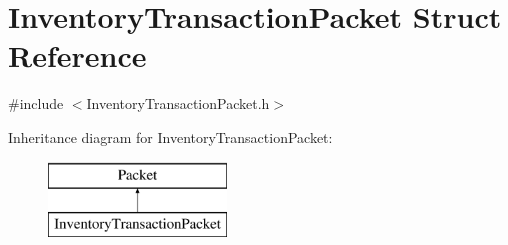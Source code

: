 \hypertarget{struct_inventory_transaction_packet}{}\section{Inventory\+Transaction\+Packet Struct Reference}
\label{struct_inventory_transaction_packet}


{\ttfamily \#include $<$Inventory\+Transaction\+Packet.\+h$>$}

Inheritance diagram for Inventory\+Transaction\+Packet\+:\begin{figure}[H]
\begin{center}
\leavevmode
\includegraphics[height=2.000000cm]{struct_inventory_transaction_packet}
\end{center}
\end{figure}
